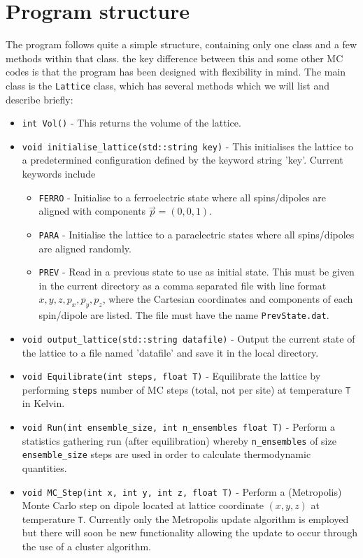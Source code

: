 \documentclass[aps,prb,twocolumn,showpacs,superscriptaddress,floatfix]{revtex4-1}
\begin{document}
\section{Program structure}
The program follows quite a simple structure, containing only one class and a few methods within that class. the key difference between this and some other MC codes is that the program has been designed with flexibility in mind. The main class is the {\tt Lattice} class, which has several methods which we will list and describe briefly:

\begin{itemize}
\item {\tt int Vol()} - This returns the volume of the lattice.
\item {\tt void initialise\_lattice(std::string key)} - This initialises the lattice to a predetermined configuration defined by the keyword string 'key'. Current keywords include 
	\begin{itemize}
	\item {\tt FERRO} - Initialise to a ferroelectric state where all spins/dipoles are aligned with components $\vec{p}=(0,0,1)$.
	\item {\tt PARA} - Initialise the lattice to a paraelectric states where all spins/dipoles are aligned randomly.
	\item {\tt PREV} - Read in a previous state to use as initial state. This must be given in the current directory as a comma separated file with line format $x,y,z,p_x,p_y,p_z$, where the Cartesian coordinates and components of each spin/dipole are listed. The file must have the name {\tt PrevState.dat}. 
	\end{itemize}
\item {\tt void output\_lattice(std::string datafile)} - Output the current state of the lattice to a file named 'datafile' and save it in the local directory.
\vspace{5pt}
\item {\tt void Equilibrate(int steps, float T)} - Equilibrate the lattice by performing {\tt steps} number of MC steps (total, not per site) at temperature {\tt T} in Kelvin.
\item {\tt void Run(int ensemble\_size, int n\_ensembles float T)} - Perform a statistics gathering run (after equilibration) whereby {\tt n\_ensembles} of  size {\tt ensemble\_size} steps are used in order to calculate thermodynamic quantities.
\item {\tt void MC\_Step(int x, int y, int z, float T)} -  Perform a (Metropolis) Monte Carlo step on dipole located at lattice coordinate $(x,y,z)$ at temperature {\tt T}. Currently only the Metropolis update algorithm is employed but there will soon be new functionality allowing the update to occur through the use of a cluster algorithm.

\end{itemize}
\end{document}
